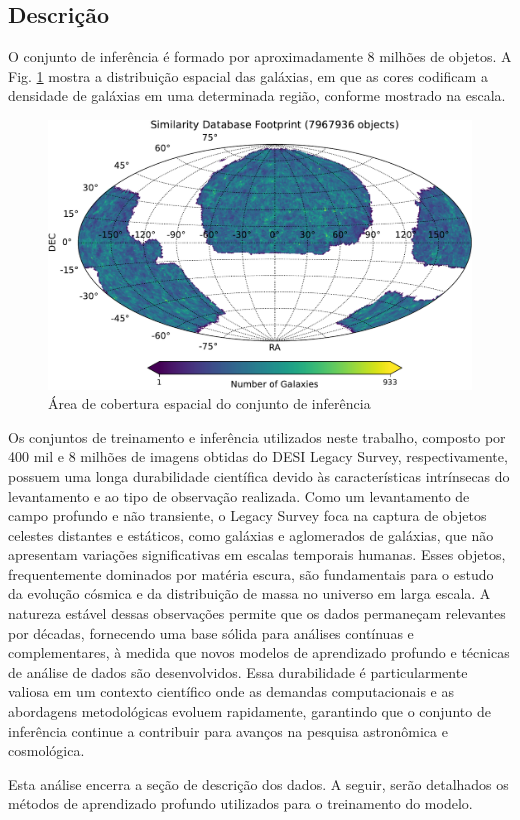\subsection{Descrição}
\label{sec:dados-inferencia-descricao}
O conjunto de inferência é formado por aproximadamente 8 milhões de objetos. A Fig. \ref{fig:conjuntos_inferencia} mostra a distribuição espacial das galáxias, em que as cores codificam a densidade de galáxias em uma determinada região, conforme mostrado na escala.

\begin{figure}[!ht]
  \centering
  \caption{Área de cobertura espacial do conjunto de inferência}
  \label{fig:conjuntos_inferencia}
  \includegraphics[width=\linewidth]{figures/similarity_footprint.pdf}
\end{figure}


Os conjuntos de treinamento e inferência utilizados neste trabalho, composto por 400 mil e 8 milhões de imagens obtidas do DESI Legacy Survey, respectivamente, possuem uma longa durabilidade científica devido às características intrínsecas do levantamento e ao tipo de observação realizada. Como um levantamento de campo profundo e não transiente, o Legacy Survey foca na captura de objetos celestes distantes e estáticos, como galáxias e aglomerados de galáxias, que não apresentam variações significativas em escalas temporais humanas. Esses objetos, frequentemente dominados por matéria escura, são fundamentais para o estudo da evolução cósmica e da distribuição de massa no universo em larga escala. A natureza estável dessas observações permite que os dados permaneçam relevantes por décadas, fornecendo uma base sólida para análises contínuas e complementares, à medida que novos modelos de aprendizado profundo e técnicas de análise de dados são desenvolvidos. Essa durabilidade é particularmente valiosa em um contexto científico onde as demandas computacionais e as abordagens metodológicas evoluem rapidamente, garantindo que o conjunto de inferência continue a contribuir para avanços na pesquisa astronômica e cosmológica.

Esta análise encerra a seção de descrição dos dados. A seguir, serão detalhados os métodos de aprendizado profundo utilizados para o treinamento do modelo.





\chaptersep
